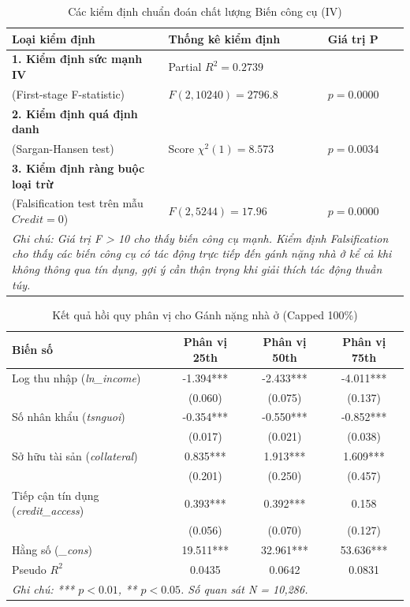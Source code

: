 \documentclass[12pt,a4paper]{report}
\begin{document}
\vspace{2em}


\begin{table}[htbp]
	\centering
	\caption{Các kiểm định chuẩn đoán chất lượng Biến công cụ (IV)}
	\label{tab:iv_diagnostics}
	\begin{tabular}{lll}
		\toprule
		\textbf{Loại kiểm định} & \textbf{Thống kê kiểm định} & \textbf{Giá trị P} \\
		\midrule
		\textbf{1. Kiểm định sức mạnh IV} & Partial $R^2 = 0.2739$ & \\
		(First-stage F-statistic) & $F(2, 10240) = 2796.8$ & $p = 0.0000$ \\
		\midrule
		\textbf{2. Kiểm định quá định danh} & & \\
		(Sargan-Hansen test) & Score $\chi^2(1) = 8.573$ & $p = 0.0034$ \\
		\midrule
		\textbf{3. Kiểm định ràng buộc loại trừ} & & \\
		(Falsification test trên mẫu $Credit=0$) & $F(2, 5244) = 17.96$ & $p = 0.0000$ \\
		\bottomrule
		\multicolumn{3}{p{12cm}}{\footnotesize \textit{Ghi chú: Giá trị F > 10 cho thấy biến công cụ mạnh. Kiểm định Falsification cho thấy các biến công cụ có tác động trực tiếp đến gánh nặng nhà ở kể cả khi không thông qua tín dụng, gợi ý cần thận trọng khi giải thích tác động thuần túy.}}
	\end{tabular}
\end{table}

\begin{table}[htbp]
	\centering
	\caption{Kết quả hồi quy phân vị cho Gánh nặng nhà ở (Capped 100\%)}
	\label{tab:quantile_reg}
	\begin{tabular}{lccc}
		\toprule
		\textbf{Biến số} & \textbf{Phân vị 25th} & \textbf{Phân vị 50th} & \textbf{Phân vị 75th} \\
		\midrule
		Log thu nhập (\textit{ln\_income}) & -1.394*** & -2.433*** & -4.011*** \\
		& (0.060) & (0.075) & (0.137) \\
		Số nhân khẩu (\textit{tsnguoi}) & -0.354*** & -0.550*** & -0.852*** \\
		& (0.017) & (0.021) & (0.038) \\
		Sở hữu tài sản (\textit{collateral}) & 0.835*** & 1.913*** & 1.609*** \\
		& (0.201) & (0.250) & (0.457) \\
		Tiếp cận tín dụng (\textit{credit\_access}) & 0.393*** & 0.392*** & 0.158 \\
		& (0.056) & (0.070) & (0.127) \\
		\midrule
		Hằng số (\textit{\_cons}) & 19.511*** & 32.961*** & 53.636*** \\
		Pseudo $R^2$ & 0.0435 & 0.0642 & 0.0831 \\
		\bottomrule
		\multicolumn{4}{l}{\footnotesize \textit{Ghi chú: *** $p<0.01$, ** $p<0.05$. Số quan sát N = 10,286.}} \\
	\end{tabular}
\end{table}
\end{document}
